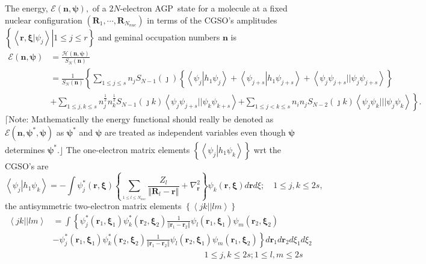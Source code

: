 \documentclass[aps,preprint]{revtex4}%
\begin{document}
The energy, $\mathcal{E}\left(  \bm{n,\psi}\right)  ,$ of a $2N$-electron
AGP\ state for a molecule at a fixed nuclear configuration $\left(
\bm{R}_{1},\cdots,\bm{R}_{N_{nuc}}\right)  $ in terms of the CGSO's amplitudes
$\left\{  \left.  \left\langle \left.  \bm{r,\xi}\right\vert \psi
_{j}\right\rangle \right\vert 1\leq j\leq r\right\}  $ and geminal occupation
numbers $\bm{n}$ is
\begin{align}
\mathcal{E}\left(  \bm{n,\psi}\right)   &  =\frac{\mathcal{H}\left(
\bm{n,\psi}\right)  }{S_{N}\left(  \bm{n}\right)  }\nonumber\\
&  =\frac{1}{S_{N}\left(  \bm{n}\right)  }\left\{  \sum_{1\leq j\leq s}%
n_{j}S_{N-1}\left(  \jmath\right)  \left\{  \left\langle \psi_{j}\left\vert
h_{1}\psi_{j}\right.  \right\rangle +\left\langle \psi_{j+s}\left\vert
h_{1}\psi_{j+s}\right.  \right\rangle +\left\langle \psi_{j}\psi_{j+s}%
||\psi_{j}\psi_{j+s}\right\rangle \right\}  \right. \nonumber\\
&  +\sum_{1\leq j,k\leq s}n_{j}^{\frac{1}{2}}n_{k}^{\frac{1}{2}}S_{N-1}\left(
\jmath k\right)  \left\langle \psi_{j}\psi_{j+s}||\psi_{k}\psi_{k+s}%
\right\rangle \left.  +\sum_{1\leq j<k\leq s}n_{i}n_{j}S_{N-2}\left(  \jmath
k\right)  \left\langle \psi_{j}\psi_{k}|||\psi_{j}\psi_{k}\right\rangle
\right\}  . \label{energy}%
\end{align}
$\lceil$Note: Mathematically the energy functional should really be denoted as
$\mathcal{E}\left(  \bm{n,\psi}^{\ast}\bm{,\psi}\right)  $ as $\bm{\psi}^{\ast
}$ and $\bm{\psi}$ are treated as independent variables even though
$\bm{\psi}$ determines $\bm{\psi}^{\ast}$.$\rfloor$ The one-electron matrix
elements $\left\{  \left\langle \psi_{j}\left\vert h_{1}\psi_{k}\right.
\right\rangle \right\}  $ wrt the CGSO's are
\begin{equation}
\left\langle \psi_{j}\left\vert h_{1}\psi_{k}\right.  \right\rangle =-\int
\psi_{j}^{\ast}\left(  \bm{r,\xi}\right)  \left\{  \sum_{_{1\leq l\leq
N_{nuc}}}\frac{Z_{l}}{\left\Vert \bm{R}_{l}-\bm{r}\right\Vert }+\nabla
_{\bm{r}}^{2}\right\}  \psi_{k}\left(  \bm{r,\xi}\right)  d\bm{r}d\xi
;\quad1\leq j,k\leq2s, \label{h1}%
\end{equation}
the antisymmetric two-electron matrix elements $\left\{  \left\langle
jk||lm\right\rangle \right\}  $
\begin{align}
\left\langle jk||lm\right\rangle  &  =\int\left\{  \psi_{j}^{\ast}\left(
\bm{r}_{1}\bm{,\xi}_{1}\right)  \psi_{k}^{\ast}\left(  \bm{r}_{2}%
\bm{,\xi}_{2}\right)  \frac{1}{\left\Vert \bm{r}_{1}-\bm{r}_{2}\right\Vert
}\psi_{l}\left(  \bm{r}_{1}\bm{,\xi}_{1}\right)  \psi_{m}\left(
\bm{r}_{2}\bm{,\xi}_{2}\right)  \right. \nonumber\\
&  -\left.  \psi_{j}^{\ast}\left(  \bm{r}_{1}\bm{,\xi}_{1}\right)  \psi
_{k}^{\ast}\left(  \bm{r}_{2}\bm{,\xi}_{2}\right)  \frac{1}{\left\Vert
\bm{r}_{1}-\bm{r}_{2}\right\Vert }\psi_{l}\left(  \bm{r}_{2}\bm{,\xi}_{1}%
\right)  \psi_{m}\left(  \bm{r}_{1}\bm{,\xi}_{2}\right)  \right\}
d\bm{r}_{1}d\bm{r}_{2}d\xi_{1}d\xi_{2}\nonumber\\
&  \left.  {}\right.  \qquad\qquad\qquad\qquad\qquad\qquad\qquad\qquad
\qquad1\leq j,k\leq2s;1\leq l,m\leq2s \label{h2}%
\end{align}
\end{document}
